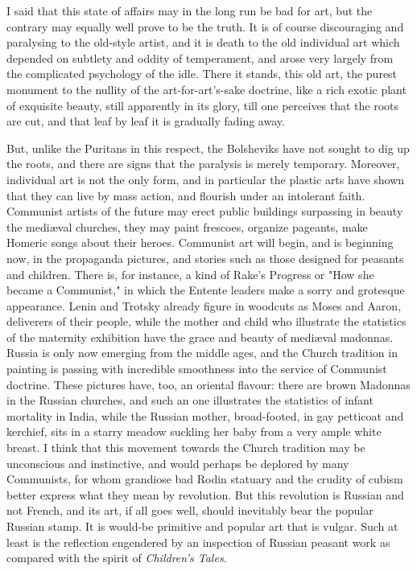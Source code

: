 I said that this state of affairs may in the long run be bad for art, but the contrary may equally well prove to be the truth. It is of course discouraging and paralysing to the old-style artist, and it is death to the old individual art which depended on subtlety and oddity of temperament, and arose very largely from the complicated psychology of the idle. There it stands, this old art, the purest monument to the nullity of the art-for-art's-sake doctrine, like a rich exotic plant of exquisite beauty, still apparently in its glory, till one perceives that the roots are cut, and that leaf by leaf it is gradually fading away.

But, unlike the Puritans in this respect, the Bolsheviks have not sought to dig up the roots, and there are signs that the paralysis is merely temporary. Moreover, individual art is not the only form, and in particular the plastic arts have shown that they can live by mass action, and flourish under an intolerant faith. Communist artists of the future may erect public buildings surpassing in beauty the mediæval churches, they may paint frescoes, organize pageants, make Homeric songs about their heroes. Communist art will begin, and is beginning now, in the propaganda pictures, and stories such as those designed for peasants and children. There is, for instance, a kind of Rake's Progress or "How she became a Communist," in which the Entente leaders make a sorry and grotesque appearance. Lenin and Trotsky already figure in woodcuts as Moses and Aaron, deliverers of their people, while the mother and child who illustrate the statistics of the maternity exhibition have the grace and beauty of mediæval madonnas. Russia is only now emerging from the middle ages, and the Church tradition in painting is passing with incredible smoothness into the service of Communist doctrine. These pictures have, too, an oriental flavour: there are brown Madonnas in the Russian churches, and such an one illustrates the statistics of infant mortality in India, while the Russian mother, broad-footed, in gay petticoat and kerchief, sits in a starry meadow suckling her baby from a very ample white breast. I think that this movement towards the Church tradition may be unconscious and instinctive, and would perhaps be deplored by many Communists, for whom grandiose bad Rodin statuary and the crudity of cubism better express what they mean by revolution. But this revolution is Russian and not French, and its art, if all goes well, should inevitably bear the popular Russian stamp. It is would-be primitive and popular art that is vulgar. Such at least is the reflection engendered by an inspection of Russian peasant work as compared with the spirit of \emph{Children's Tales}.

